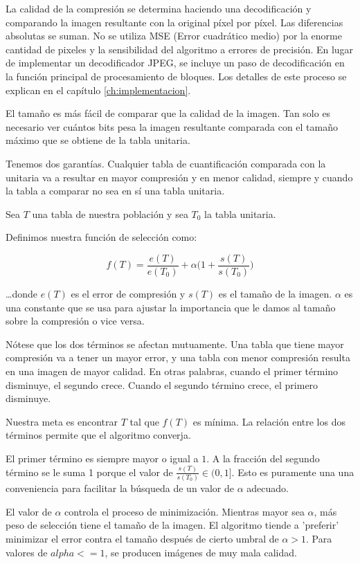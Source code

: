 La calidad de la compresión se determina haciendo una decodificación y
comparando la imagen resultante con la original píxel por píxel. Las
diferencias absolutas se suman. No se utiliza MSE (Error cuadrático medio) por
la enorme cantidad de pixeles y la sensibilidad del algoritmo a errores de
precisión. En lugar de implementar un decodificador JPEG, se incluye un paso de
decodificación en la función principal de procesamiento de bloques. Los
detalles de este proceso se explican en el capítulo \ref{ch:implementacion}.

El tamaño es más fácil de comparar que la calidad de la imagen. Tan solo es
necesario ver cuántos bits pesa la imagen resultante comparada con el tamaño
máximo que se obtiene de la tabla unitaria.

Tenemos dos garantías. Cualquier tabla de cuantificación comparada con la
unitaria va a resultar en mayor compresión y en menor calidad, siempre y cuando
la tabla a comparar no sea en sí una tabla unitaria.

Sea $T$ una tabla de nuestra población y sea $T_0$ la tabla unitaria.

Definimos nuestra función de selección como:

\begin{equation}
f(T) = \frac{e(T)}{e(T_0)} + \alpha \Big(1 + \frac{s(T)}{s(T_0)}\Big)
\end{equation}\label{eq:fitness}

\dots donde $e(T)$ es el error de compresión y $s(T)$ es el tamaño de la
imagen. $\alpha$ es una constante que se usa para ajustar la importancia que le
damos al tamaño sobre la compresión o vice versa.

Nótese que los dos términos se afectan mutuamente. Una tabla que tiene mayor
compresión va a tener un mayor error, y una tabla con menor compresión resulta
en una imagen de mayor calidad. En otras palabras, cuando el primer término
disminuye, el segundo crece.  Cuando el segundo término crece, el primero
disminuye.

Nuestra meta es encontrar $T$ tal que $f(T)$ es mínima. La relación entre los
dos términos permite que el algoritmo converja.

El primer término es siempre mayor o igual a $1$. A la fracción del segundo
término se le suma 1 porque el valor de $\frac{s(T)}{s(T_0)} \in (0, 1]$. Esto
es puramente una una conveniencia para facilitar la búsqueda de un valor de
$\alpha$ adecuado.

El valor de $\alpha$ controla el proceso de minimización. Mientras mayor sea
$\alpha$, más peso de selección tiene el tamaño de la imagen. El algoritmo tiende
a 'preferir' minimizar el error contra el tamaño después de cierto umbral de
$\alpha > 1$. Para valores de $alpha <= 1$, se producen imágenes de muy mala calidad.

